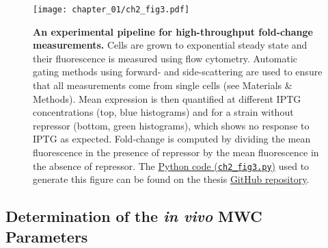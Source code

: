 \documentclass[12pt]{caltech_thesis}
\begin{document}
\hypertarget{fig:flowchart}{%
\begin{figure}
\centering
\texttt{[image: chapter\_01/ch2\_fig3.pdf]}
\caption[{An experimental pipeline for high-throughput fold-change
measurements.}]{\textbf{An experimental pipeline for high-throughput
fold-change measurements.} Cells are grown to exponential steady state
and their fluorescence is measured using flow cytometry. Automatic
gating methods using forward- and side-scattering are used to ensure
that all measurements come from single cells (see Materials \& Methods).
Mean expression is then quantified at different IPTG concentrations
(top, blue histograms) and for a strain without repressor (bottom, green
histograms), which shows no response to IPTG as expected. Fold-change is
computed by dividing the mean fluorescence in the presence of repressor
by the mean fluorescence in the absence of repressor. The
\href{https://github.com/gchure/phd/blob/master/src/chapter_02/code/ch2_fig3.py}{Python
code (\texttt{ch2\_fig3.py})} used to generate this figure can be found
on the thesis \href{https://github.com/gchure/phd}{GitHub repository}.}
\label{fig:flowchart}
\end{figure}
}

\hypertarget{determination-of-the-in-vivo-mwc-parameters}{%
\subsection{\texorpdfstring{Determination of the \emph{in vivo} MWC
Parameters}{Determination of the in vivo MWC Parameters}}\label{determination-of-the-in-vivo-mwc-parameters}}
\end{document}
